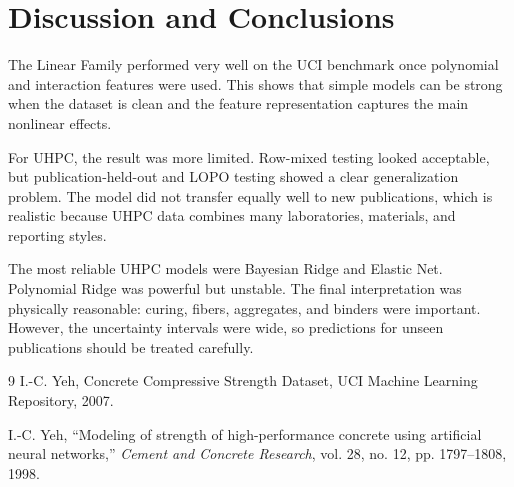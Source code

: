 \documentclass[10pt]{article}
\begin{document}
\section{Discussion and Conclusions}

The Linear Family performed very well on the UCI benchmark once polynomial and interaction features were used. This shows that simple models can be strong when the dataset is clean and the feature representation captures the main nonlinear effects.

For UHPC, the result was more limited. Row-mixed testing looked acceptable, but publication-held-out and LOPO testing showed a clear generalization problem. The model did not transfer equally well to new publications, which is realistic because UHPC data combines many laboratories, materials, and reporting styles.

The most reliable UHPC models were Bayesian Ridge and Elastic Net. Polynomial Ridge was powerful but unstable. The final interpretation was physically reasonable: curing, fibers, aggregates, and binders were important. However, the uncertainty intervals were wide, so predictions for unseen publications should be treated carefully.

\begin{thebibliography}{9}
I.-C. Yeh, Concrete Compressive Strength Dataset, UCI Machine Learning Repository, 2007.

I.-C. Yeh, ``Modeling of strength of high-performance concrete using artificial neural networks,'' \textit{Cement and Concrete Research}, vol. 28, no. 12, pp. 1797--1808, 1998.
\end{thebibliography}
\end{document}
